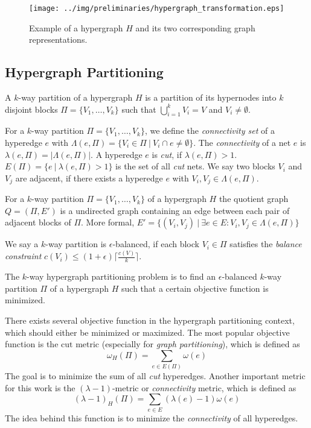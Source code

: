\begin{figure}
\centering
\texttt{[image: ../img/preliminaries/hypergraph\_transformation.eps]}
\caption{Example of a hypergraph $H$ and its two corresponding graph representations.} 
\label{img:hypergraph_transformation}
\end{figure}

\subsection{Hypergraph Partitioning}

\begin{definition}
A $k$-way partition of a hypergraph $H$ is a partition of its hypernodes into
$k$ disjoint blocks $\Pi = \{V_1,\ldots,V_k\}$ such that $\bigcup_{i=1}^{k} V_i = V$
and $V_i \neq \emptyset$.
\label{def:kway_partition}
\end{definition}

For a $k$-way partition $\Pi = \{V_1,\ldots,V_k\}$, we define the \emph{connectivity set} of a
hyperedge $e$ with $\Lambda(e,\Pi) = \{V_i \in \Pi\ |\ V_i \cap e \neq \emptyset\}$. The \emph{connectivity}
of a net $e$ is $\lambda(e,\Pi) = |\Lambda(e,\Pi)|$. A hyperedge $e$ is \emph{cut}, if
$\lambda(e,\Pi) > 1$. $E(\Pi) = \{e\ |\ \lambda(e,\Pi) > 1\}$ is the set of all \emph{cut} 
nets. We say two blocks $V_i$ and $V_j$ are adjacent, if there exists a hyperedge
$e$ with $V_i,V_j \in \Lambda(e,\Pi)$.

\begin{definition}
For a $k$-way partition $\Pi = \{V_1,\ldots,V_k\}$ of a hypergraph $H$ 
the quotient graph $Q = (\Pi,E')$ is a undirected graph containing an 
edge between each pair of adjacent blocks of $\Pi$.
More formal, $E' = \{(V_i,V_j)\ |\ \exists e \in E: V_i,V_j \in \Lambda(e,\Pi)\}$
\label{def:quotient_graph}
\end{definition}

We say a $k$-way partition is $\epsilon$-balanced, if each block 
$V_i \in \Pi$ satisfies the \emph{balance constraint} 
$c(V_i) \le (1+\epsilon)\lceil\frac{c(V)}{k}\rceil$.

\begin{definition}
The $k$-way hypergraph partitioning problem is to find an $\epsilon$-balanced $k$-way
partition $\Pi$ of a hypergraph $H$ such that a certain objective function is minimized.
\label{def:kway_partitioning_problem}
\end{definition}

There exists several objective function in the hypergraph partitioning context,
which should either be minimized or maximized. The most popular objective function 
is the $\text{cut}$ metric (especially for \emph{graph partitioning}), which is defined as
\[\omega_H(\Pi) = \sum_{e \in E(\Pi)} \omega(e)\]
The goal is to minimize the sum of all \emph{cut} hyperedges. Another important metric
for this work is the $(\lambda - 1)$-metric or \emph{connectivity} metric, 
which is defined as
\[(\lambda - 1)_H(\Pi) = \sum_{e \in E} (\lambda(e) - 1)\omega(e)\]
The idea behind this function is to minimize the \emph{connectivity} of all hyperedges.